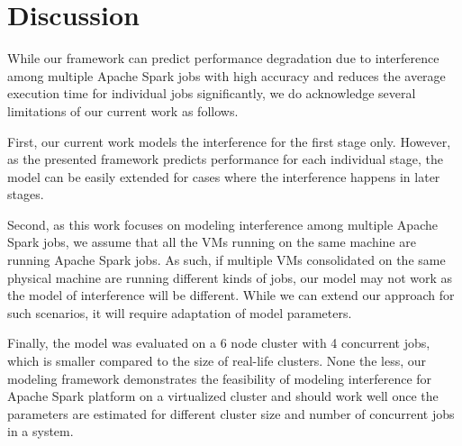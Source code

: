 
\section{Discussion}
\label{discussion}
While our framework can predict performance degradation due to interference among multiple Apache Spark jobs with high accuracy and reduces the average execution time for individual jobs significantly, we do acknowledge several limitations of our current work as follows. 

\noindent

\noindent
First, our current work models the interference for the first stage only. However, as the presented framework predicts performance for each individual stage, the model can be easily extended for cases where the interference happens in later stages.

\noindent
Second, as this work focuses on modeling interference among multiple Apache Spark jobs, we assume that all the VMs running on the same machine are running Apache Spark jobs. As such, if multiple VMs consolidated on the same physical machine are running different kinds of jobs, our model may not work as the model of interference will be different. While we can extend our approach for such scenarios, it will require adaptation of model parameters. 

\noindent
Finally, the model was evaluated on a 6 node cluster with 4 concurrent jobs, which is smaller compared to the size of real-life clusters. None the less, our modeling framework demonstrates the feasibility of modeling interference for Apache Spark platform on a virtualized cluster and should work well once the parameters are estimated for different cluster size and number of concurrent jobs in a system.










